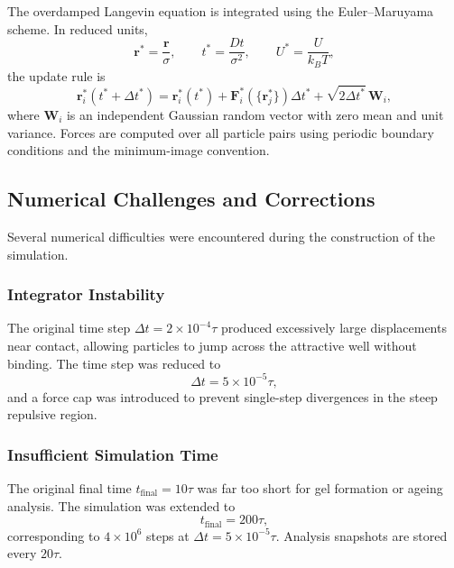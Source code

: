 \documentclass[11pt,a4paper]{article}
\begin{document}
The overdamped Langevin equation is integrated using the Euler--Maruyama scheme. In reduced units,
\begin{equation}
    \mathbf r^* = \frac{\mathbf r}{\sigma},
    \qquad
    t^* = \frac{Dt}{\sigma^2},
    \qquad
    U^* = \frac{U}{k_B T},
\end{equation}
the update rule is
\begin{equation}
    \mathbf r_i^*(t^*+\Delta t^*)
    =
    \mathbf r_i^*(t^*)
    +
    \mathbf F_i^*(\{\mathbf r_j^*\})\Delta t^*
    +
    \sqrt{2\Delta t^*}\,\mathbf W_i,
    \label{eq:euler_maruyama}
\end{equation}
where $\mathbf W_i$ is an independent Gaussian random vector with zero mean and unit variance. Forces are computed over all particle pairs using periodic boundary conditions and the minimum-image convention.

\subsection{Numerical Challenges and Corrections}

Several numerical difficulties were encountered during the construction of the simulation.

\subsubsection{Integrator Instability}

The original time step $\Delta t = 2\times10^{-4}\tau$ produced excessively large displacements near contact, allowing particles to jump across the attractive well without binding. The time step was reduced to
\begin{equation}
    \Delta t = 5\times10^{-5}\tau,
\end{equation}
and a force cap was introduced to prevent single-step divergences in the steep repulsive region.

\subsubsection{Insufficient Simulation Time}

The original final time $t_{\mathrm{final}}=10\tau$ was far too short for gel formation or ageing analysis. The simulation was extended to
\begin{equation}
    t_{\mathrm{final}} = 200\tau,
\end{equation}
corresponding to $4\times 10^6$ steps at $\Delta t=5\times10^{-5}\tau$. Analysis snapshots are stored every $20\tau$.
\end{document}
